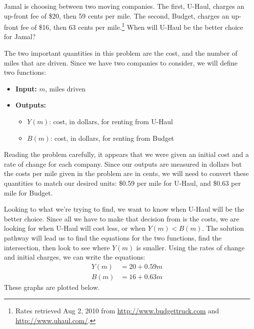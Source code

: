 \begin{example}
Jamal is choosing between two moving companies. The first, U-Haul, charges an up-front fee of \$20, then 59 cents per mile. The second, Budget, charges an up-front fee of \$16, then 63 cents per mile.\footnote{Rates retrieved Aug 2, 2010 from \url{http://www.budgettruck.com} and \url{http://www.uhaul.com/}.} When will U-Haul be the better choice
for Jamal?

\begin{solution} The two important quantities in this problem are the cost, and the number of miles that are driven. Since we have two companies to consider, we will define two functions:
  \begin{itemize}
    \item[] {\bf Input:} $m$, miles driven
    \item[] {\bf Outputs:}
      \begin{itemize}
        \item[] $Y(m)$: cost, in dollars, for renting from U-Haul
        \item[] $B(m)$: cost, in dollars, for renting from Budget
      \end{itemize}
    \end{itemize}
Reading the problem carefully, it appears that we were given an initial cost and a rate of change for each company. Since our outputs are measured in dollars but the costs per mile given in the problem are in cents, we will need to convert these quantities to match our desired units: \$0.59 per mile for U-Haul, and \$0.63 per mile for Budget.

Looking to what we're trying to find, we want to know when U-Haul will be the better choice. Since all we have to make that decision from is the costs, we are looking for when U-Haul will cost less, or when $Y(m) < B(m)$. The solution pathway will lead us to find the equations for the two functions, find the intersection, then look to see where $Y(m)$ is smaller. Using the rates of change and initial charges, we can write the equations:
\begin{align*}
  Y(m) &= 20 + 0.59 m\\
  B(m) &= 16 + 0.63 m
\end{align*}
These graphs are plotted below.


\end{solution}
\end{example}
